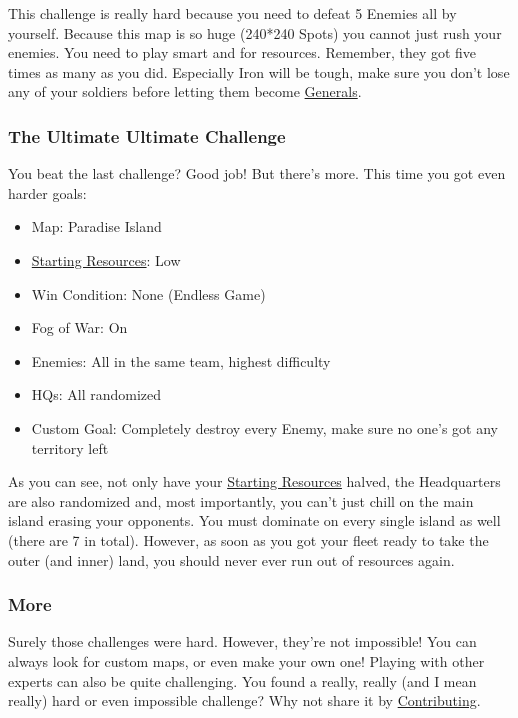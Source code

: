 \documentclass[12pt]{article}
\begin{document}
This challenge is really hard because you need to defeat 5 Enemies all by yourself. Because this map is so huge (240*240 Spots) you cannot just rush your enemies. You need to play smart and for resources. Remember, they got five times as many as you did. Especially Iron will be tough, make sure you don't lose any of your soldiers before letting them become \hyperref[sec:general]{Generals}.

\subsubsection{The Ultimate Ultimate Challenge}
\label{sec:challenge_ultimate_ultimate}

You beat the last challenge? Good job! But there's more. This time you got even harder goals:

\begin{itemize}
  \item Map: Paradise Island
  \item \hyperref[sec:startingresources]{Starting Resources}: Low
  \item Win Condition: None (Endless Game)
  \item Fog of War: On
  \item Enemies: All in the same team, highest difficulty
  \item HQs: All randomized
  \item Custom Goal: Completely destroy every Enemy, make sure no one's got any territory left
\end{itemize}

As you can see, not only have your \hyperref[sec:startingresources]{Starting Resources} halved, the Headquarters are also randomized and, most importantly, you can't just chill on the main island erasing your opponents. You must dominate on every single island as well (there are 7 in total). However, as soon as you got your fleet ready to take the outer (and inner) land, you should never ever run out of resources again.

\subsubsection{More}
\label{sec:challenge_more}

Surely those challenges were hard. However, they're not impossible! You can always look for custom maps, or even make your own one! Playing with other experts can also be quite challenging. You found a really, really (and I mean really) hard or even impossible challenge? Why not share it by \hyperref[sec:contributing]{Contributing}.
\end{document}
